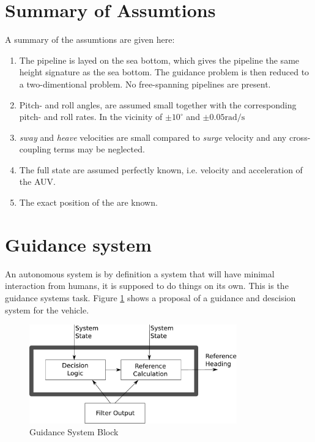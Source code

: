 \section{Summary of Assumtions}
	A summary of the assumtions are given here:
	\begin{enumerate}
		\item The pipeline is layed on the sea bottom, which gives the pipeline the same
		height signature as the sea bottom. The guidance problem is then reduced to a
		two-dimentional problem. No free-spanning pipelines are present.
		\item Pitch- and roll angles, are assumed small together with the corresponding pitch- and
		roll rates. In the vicinity of $\pm 10^{\circ}$ and $\pm 0.05 \mathrm{rad/s}$
		\item \textit{sway} and \textit{heave} velocities are small compared to \textit{surge}
		velocity and any cross-coupling terms may be neglected.
		\item The full state are assumed perfectly known, i.e. velocity and acceleration of the AUV.
		\item The exact position of the are known.
	\end{enumerate}
		


\section{Guidance system}
	An autonomous system is by definition a system that will have minimal interaction from humans, it is
	supposed to do things on its own. This is the guidance systems task.
	Figure \ref{fig:ch2-Guidance-block} shows a proposal of a guidance and descision system for 
	the \hugin vehicle.
	\begin{figure}[htbp]
		\centering
		\includegraphics[width=0.8\textwidth]{pics/guidance}
		\caption{Guidance System Block}
		\label{fig:ch2-Guidance-block}
	\end{figure}

